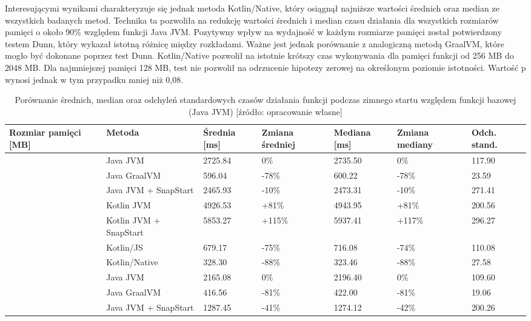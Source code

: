 Interesującymi wynikami charakteryzuje się jednak metoda Kotlin/Native, który osiągnął najniższe wartości średnich oraz median ze wszystkich badanych metod.
Technika ta pozwoliła na redukcję wartości średnich i median czasu działania dla wszystkich rozmiarów pamięci o około 90\% względem funkcji Java JVM.
Pozytywny wpływ na wydajność w każdym rozmiarze pamięci został potwierdzony testem Dunn, który wykazał istotną różnicę między rozkładami.
Ważne jest jednak porównanie z analogiczną metodą GraalVM, które mogło być dokonane poprzez test Dunn.
Kotlin/Native pozwolił na istotnie krótszy czas wykonywania dla pamięci funkcji od 256 MB do 2048 MB.
Dla najmniejszej pamięci 128 MB, test nie pozwolił na odrzucenie hipotezy zerowej na określonym poziomie istotności.
Wartość p wynosi jednak w tym przypadku mniej niż 0,08.

\begin{table}[htbp]
\centering
\caption{Porównanie średnich, median oraz odchyleń standardowych czasów działania funkcji podczas zimnego startu względem funkcji bazowej (Java JVM) [źródło: opracowanie własne]}
\small
\begin{tabular}{|>{\centering\arraybackslash}m{1.5cm}|l|p{1.5cm}|p{1.5cm}|p{1.5cm}|p{1.5cm}|p{1.5cm}|}
\toprule
Rozmiar pamięci [MB] & Metoda & Średnia [ms] & Zmiana średniej & Mediana [ms] & Zmiana mediany & Odch. stand. \\
\midrule
\multirow{7}{*}{128} & Java JVM & 2725.84 & \mbox{0\%} & 2735.50 & \mbox{0\%} & 117.90 \\
 & Java GraalVM & 596.04 & \mbox{-78\%} & 600.22 & \mbox{-78\%} & 23.59 \\
 & Java JVM + SnapStart & 2465.93 & \mbox{-10\%} & 2473.31 & \mbox{-10\%} & 271.41 \\
 & Kotlin JVM & 4926.53 & \mbox{+81\%} & 4943.95 & \mbox{+81\%} & 200.56 \\
 & Kotlin JVM + SnapStart & 5853.27 & \mbox{+115\%} & 5937.41 & \mbox{+117\%} & 296.27 \\
 & Kotlin/JS & 679.17 & \mbox{-75\%} & 716.08 & \mbox{-74\%} & 110.08 \\
 & Kotlin/Native & 328.30 & \mbox{-88\%} & 323.46 & \mbox{-88\%} & 27.58 \\
\midrule
\multirow{7}{*}{256} & Java JVM & 2165.08 & \mbox{0\%} & 2196.40 & \mbox{0\%} & 109.60 \\
 & Java GraalVM & 416.56 & \mbox{-81\%} & 422.00 & \mbox{-81\%} & 19.06 \\
 & Java JVM + SnapStart & 1287.45 & \mbox{-41\%} & 1274.12 & \mbox{-42\%} & 200.26 \\

\end{tabular}
\end{table}
